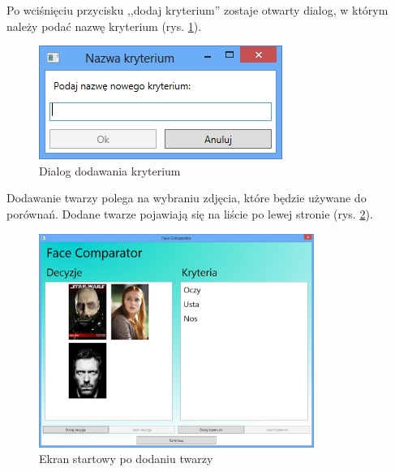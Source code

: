 \documentclass[a4paper,notitlepage]{article}
\begin{document}
Po wciśnięciu przycisku ,,dodaj kryterium'' zostaje otwarty dialog, w którym należy podać nazwę kryterium (rys. \ref{img_add_criterion_dialog}).
	\begin{figure}[!htp]
	\centering
	\caption{Dialog dodawania kryterium}
	\label{img_add_criterion_dialog}
	\includegraphics[scale=1.0]{img/addCriterionDialog}
	\end{figure}

Dodawanie twarzy polega na wybraniu zdjęcia, które będzie używane do porównań.
Dodane twarze pojawiają się na liście po lewej stronie (rys. \ref{img_faces_added}).
	\begin{figure}[!htp]
	\centering
	\caption{Ekran startowy po  dodaniu twarzy}
	\label{img_faces_added}
	\includegraphics[width=0.8\textwidth]{img/facesAdded}
	\end{figure}
\end{document}
